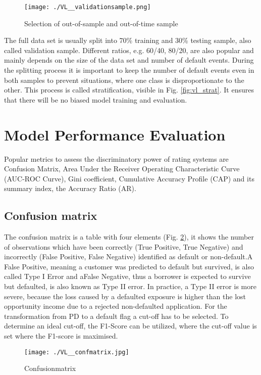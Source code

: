 \begin{figure}[H]
	\centering
	\texttt{[image: ./VL\_\_validationsample.png]}
    \caption{Selection of out-of-sample and out-of-time sample}
    \label{fig:vl_valsample}
\end{figure}

The full data set is usually split into 70\% training and 30\% testing sample, also called validation sample. Different ratios, e.g. 60/40, 80/20, are also popular and mainly depends on the size of the data set and number of default events. During the splitting process it is important to keep the number of default events even in both samples to prevent situations, where one class is disproportionate to the other. This process is called stratification, visible in Fig. \ref{fig:vl_strat}. It ensures that there will be no biased model training and evaluation. 

\section{Model Performance Evaluation}
Popular metrics to assess the discriminatory power of rating systems are Confusion Matrix, Area Under the Receiver Operating Characteristic Curve (AUC-ROC Curve), Gini coefficient, Cumulative Accuracy Profile (CAP) and its summary index, the Accuracy Ratio (AR). 

\subsection{Confusion matrix}
The confusion matrix is a table with four elements (Fig. \ref{fig:vl_confmatr}), it shows the number of observations which have been correctly (True Positive, True Negative) and incorrectly (False Positive, False Negative) identified as default or non-default.A False Positive, meaning a customer was predicted to default but survived, is also called Type I Error and aFalse Negative, thus a borrower is expected to survive but defaulted, is also known as Type II error. In practice, a Type II error is more severe, because the loss caused by a defaulted exposure is higher than the lost opportunity income due to a rejected non-defaulted application. For the transformation from PD to a default flag a cut-off has to be selected. To determine an ideal cut-off, the F1-Score can be utilized, where the cut-off value is set where the F1-score is maximised.

\begin{figure}[H]
	\centering
	\texttt{[image: ./VL\_\_confmatrix.jpg]}
    \caption{Confusionmatrix}
    \label{fig:vl_confmatr}
\end{figure}

